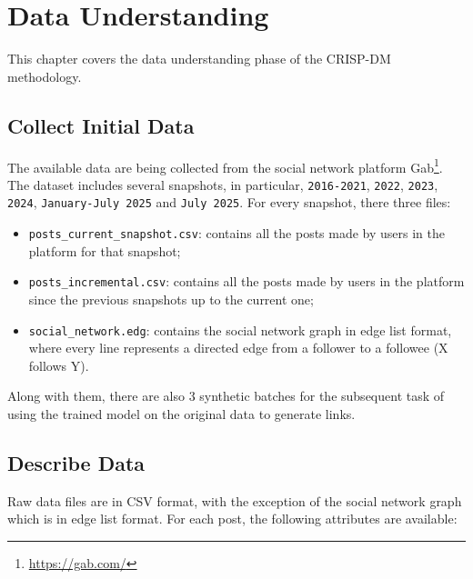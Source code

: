 
\chapter{Data Understanding}

This chapter covers the data understanding phase of the CRISP-DM methodology.

\section{Collect Initial Data}

The available data are being collected from the social network platform Gab\footnote{\url{https://gab.com/}}. The dataset includes several snapshots, in particular, \texttt{2016-2021}, \texttt{2022}, \texttt{2023}, \texttt{2024}, \texttt{January-July 2025} and \texttt{July 2025}. For every snapshot, there three files:

\begin{itemize}
	\item \texttt{posts\_current\_snapshot.csv}: contains all the posts made by users in the platform for that snapshot;
	\item \texttt{posts\_incremental.csv}: contains all the posts made by users in the platform since the previous snapshots up to the current one;
	\item \texttt{social\_network.edg}: contains the social network graph in edge list format, where every line represents a directed edge from a follower to a followee (X follows Y).
\end{itemize}

Along with them, there are also 3 synthetic batches for the subsequent task of using the trained model on the original data to generate links.

\section{Describe Data}

Raw data files are in CSV format, with the exception of the social network graph which is in edge list format. For each post, the following attributes are available:


